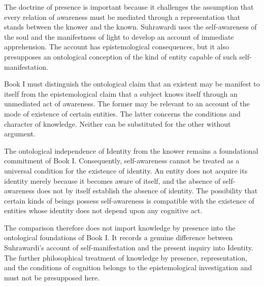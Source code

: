 The doctrine of presence is important because
it challenges the assumption that every
relation of awareness must be mediated
through a representation that stands
between the knower and the known.
Suhrawardi uses the self-awareness of
the soul and the manifestness of light
to develop an account of immediate
apprehension. The account has
epistemological consequences, but it
also presupposes an ontological
conception of the kind of entity
capable of such self-manifestation.

\label{para:VS.B01.P01.C08.S14.SS12.P003}

Book I must distinguish the ontological
claim that an existent may be manifest
to itself from the epistemological
claim that a subject knows itself
through an unmediated act of awareness.
The former may be relevant to an
account of the mode of existence of
certain entities. The latter concerns
the conditions and character of
knowledge. Neither can be substituted
for the other without argument.

\label{para:VS.B01.P01.C08.S14.SS12.P004}

The ontological independence of Identity
from the knower remains a foundational
commitment of Book I. Consequently,
self-awareness cannot be treated as
a universal condition for the existence
of identity. An entity does not acquire
its identity merely because it becomes
aware of itself, and the absence of
self-awareness does not by itself
establish the absence of identity.
The possibility that certain kinds
of beings possess self-awareness is
compatible with the existence of
entities whose identity does not
depend upon any cognitive act.

\label{para:VS.B01.P01.C08.S14.SS12.P005}

The comparison therefore does not
import knowledge by presence into
the ontological foundations of
Book I. It records a genuine
difference between Suhrawardi's
account of self-manifestation and
the present inquiry into Identity.
The further philosophical treatment
of knowledge by presence, representation,
and the conditions of cognition
belongs to the epistemological
investigation and must not be
presupposed here.


